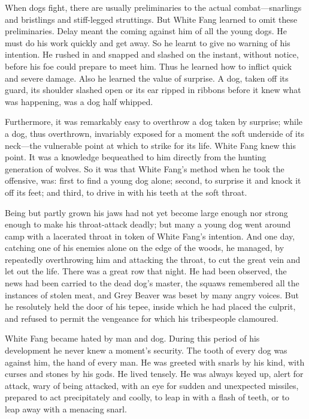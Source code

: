 \documentclass[10pt]{book}
\begin{document}
When dogs fight, there are usually preliminaries to the actual
combat—snarlings and bristlings and stiff-legged struttings. But White
Fang learned to omit these preliminaries. Delay meant the coming
against him of all the young dogs. He must do his work quickly and get
away. So he learnt to give no warning of his intention. He rushed in
and snapped and slashed on the instant, without notice, before his foe
could prepare to meet him. Thus he learned how to inflict quick and
severe damage. Also he learned the value of surprise. A dog, taken off
its guard, its shoulder slashed open or its ear ripped in ribbons
before it knew what was happening, was a dog half whipped.

Furthermore, it was remarkably easy to overthrow a dog taken by
surprise; while a dog, thus overthrown, invariably exposed for a moment
the soft underside of its neck—the vulnerable point at which to strike
for its life. White Fang knew this point. It was a knowledge bequeathed
to him directly from the hunting generation of wolves. So it was that
White Fang’s method when he took the offensive, was: first to find a
young dog alone; second, to surprise it and knock it off its feet; and
third, to drive in with his teeth at the soft throat.

Being but partly grown his jaws had not yet become large enough nor
strong enough to make his throat-attack deadly; but many a young dog
went around camp with a lacerated throat in token of White Fang’s
intention. And one day, catching one of his enemies alone on the edge
of the woods, he managed, by repeatedly overthrowing him and attacking
the throat, to cut the great vein and let out the life. There was a
great row that night. He had been observed, the news had been carried
to the dead dog’s master, the squaws remembered all the instances of
stolen meat, and Grey Beaver was beset by many angry voices. But he
resolutely held the door of his tepee, inside which he had placed the
culprit, and refused to permit the vengeance for which his tribespeople
clamoured.

White Fang became hated by man and dog. During this period of his
development he never knew a moment’s security. The tooth of every dog
was against him, the hand of every man. He was greeted with snarls by
his kind, with curses and stones by his gods. He lived tensely. He was
always keyed up, alert for attack, wary of being attacked, with an eye
for sudden and unexpected missiles, prepared to act precipitately and
coolly, to leap in with a flash of teeth, or to leap away with a
menacing snarl.
\end{document}
